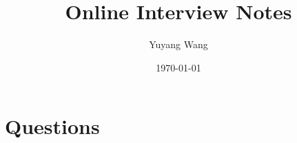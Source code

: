 


\title{Online Interview Notes}

\author{Yuyang Wang}
\date{\today}
\makeatletter
\fancyfoot[L]{\scshape \MakeLowercase{\@author}}
\fancyfoot[R]{{\scshape \MakeLowercase{\@title}}\quad{\LARGE\sfrac{\thepage}{\pageref*{LastPage}}}}
\makeatother



\maketitle%
\thispagestyle{fancy}

\tableofcontents

\section{Questions}


